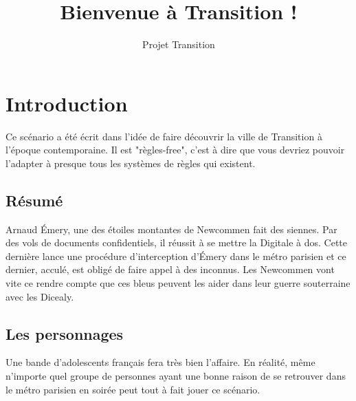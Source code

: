 \documentclass[10pt,a4paper,twocolumn]{article}
\author{Projet Transition}
\title{Bienvenue à Transition !}
\begin{document}
\maketitle
\section{Introduction}
Ce scénario a été écrit dans l'idée de faire découvrir la ville de Transition à l'époque contemporaine. Il est "règles-free", c'est à dire que vous devriez pouvoir l'adapter à presque tous les systèmes de règles qui existent.
\subsection{Résumé}
Arnaud Émery, une des étoiles montantes de Newcommen fait des siennes. Par des vols de documents confidentiels, il réussit à se mettre la Digitale à dos. Cette dernière lance une procédure d'interception d'Émery dans le métro parisien et ce dernier, acculé, est obligé de faire appel à des inconnus. Les Newcommen vont vite ce rendre compte que ces bleus peuvent les aider dans leur guerre souterraine avec les Dicealy.
\subsection{Les personnages}
Une bande d'adolescents français fera très bien l'affaire. En réalité, même n'importe quel groupe de personnes ayant une bonne raison de se retrouver dans le métro parisien en soirée peut tout à fait jouer ce scénario.
\end{document}
